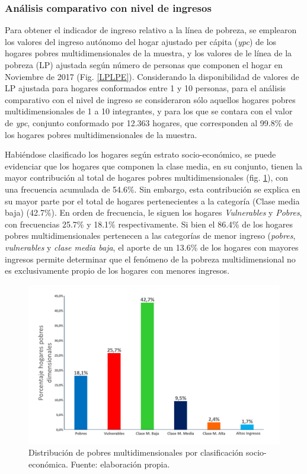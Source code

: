 \documentclass[12pt,letterpaper,spanish]{article}
\begin{document}
\subsubsection{Análisis comparativo con nivel de ingresos}


Para obtener el indicador de ingreso relativo a la línea de pobreza, se emplearon los valores del ingreso autónomo del hogar ajustado per cápita (\textit{ypc}) de los hogares pobres multidimensionales de la muestra, y los valores de le línea de la pobreza (LP) ajustada según número de personas que componen el hogar en Noviembre de 2017 (Fig. \ref{LPLPE}). Considerando la disponibilidad de valores de LP ajustada para hogares conformados entre 1 y 10 personas, para el análisis comparativo con el nivel de ingreso se consideraron sólo aquellos hogares pobres multidimensionales de 1 a 10 integrantes, y para los que se contara con el valor de \textit{ypc}, conjunto conformado por 12.363 hogares, que corresponden al 99.8\% de los hogares pobres multidimensionales de la muestra.


Habiéndose clasificado los hogares según estrato socio-económico, se puede evidenciar que los hogares que componen la clase media, en su conjunto, tienen la mayor contribución al total de hogares pobres multidimensionales (fig. \ref{distribucion_socio_pobres}), con una frecuencia acumulada de 54.6\%. Sin embargo, esta contribución se explica en su mayor parte por el total de hogares pertenecientes a la categoría \text(Clase media baja) (42.7\%). En orden de frecuencia, le siguen los hogares \textit{Vulnerables} y \textit{Pobres}, con frecuencias 25.7\% y 18.1\% respectivamente. Si bien el 86.4\% de los hogares pobres multidimensionales pertenecen a las categorías de menor ingreso (\textit{pobres}, \textit{vulnerables} y \textit{clase media baja}, el aporte de un 13.6\% de los hogares con mayores ingresos permite determinar que el fenómeno de la pobreza multidimensional no es exclusivamente propio de los hogares con menores ingresos.

\begin{figure}[H]
    \centering
    \includegraphics[height=8 cm]{Max/distribucion_pobres_clase.png}
    \caption{Distribución de pobres multidimensionales por clasificación socio-económica. Fuente: elaboración propia.}
    \label{distribucion_socio_pobres}
\end{figure}
\end{document}
